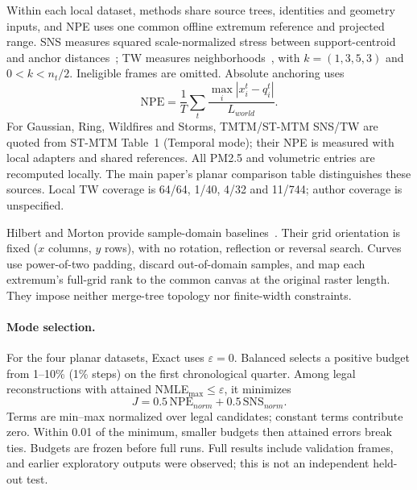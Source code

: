 \documentclass[review]{vgtc}
\begin{document}
Within each local dataset, methods share source trees, identities and geometry inputs, and NPE uses one common offline extremum reference and projected range. SNS measures squared scale-normalized stress between support-centroid and anchor distances~\cite{Smelser:2025:Scale,STMTM:2026}; TW measures neighborhoods~\cite{Venna:2001:NP}, with $k=(1,3,5,3)$ and $0<k<n_t/2$. Ineligible frames are omitted. Absolute anchoring uses
\begin{equation}\label{eq:experimental-npe}
\mathrm{NPE}=\frac{1}{T}\sum_t\frac{\max_i|x_i^t-q_i^t|}{L_{world}}.
\end{equation}
For Gaussian, Ring, Wildfires and Storms, TMTM/ST-MTM SNS/TW are quoted from ST-MTM Table~1 (Temporal mode); their NPE is measured with local adapters and shared references. All PM2.5 and volumetric entries are recomputed locally. The main paper's planar comparison table distinguishes these sources. Local TW coverage is 64/64, 1/40, 4/32 and 11/744; author coverage is unspecified.

Hilbert and Morton provide sample-domain baselines~\cite{Franke:2021:1DP}. Their grid orientation is fixed ($x$ columns, $y$ rows), with no rotation, reflection or reversal search. Curves use power-of-two padding, discard out-of-domain samples, and map each extremum's full-grid rank to the common canvas at the original raster length. They impose neither merge-tree topology nor finite-width constraints.







\paragraph{Mode selection.}
For the four planar datasets, Exact uses $\varepsilon=0$. Balanced selects a positive budget from 1--10\% (1\% steps) on the first chronological quarter. Among legal reconstructions with attained NMLE$_{\max}\le\varepsilon$, it minimizes
\begin{equation}\label{eq:balanced-validation-score}
J=0.5\,\mathrm{NPE}_{norm}+0.5\,\mathrm{SNS}_{norm}.
\end{equation}
Terms are min--max normalized over legal candidates; constant terms contribute zero. Within 0.01 of the minimum, smaller budgets then attained errors break ties. Budgets are frozen before full runs. Full results include validation frames, and earlier exploratory outputs were observed; this is not an independent held-out test.
\end{document}
